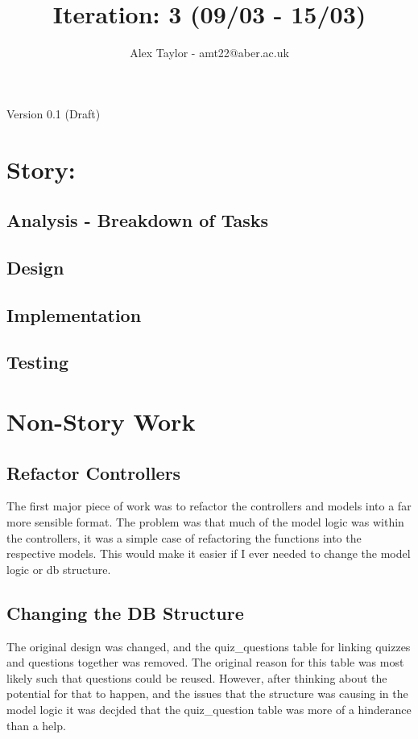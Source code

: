\documentclass{article}
\title{Iteration: 3 (09/03 - 15/03)}
\author{Alex Taylor - amt22@aber.ac.uk}
\begin{document}
\maketitle
\begin{center}
	Version 0.1 (Draft)
\end{center}
\tableofcontents
\thispagestyle{empty}
\newpage

\section{Story: }
\subsection{Analysis - Breakdown of Tasks}
\subsection{Design}
\subsection{Implementation}
\subsection{Testing}
\newpage

\section{Non-Story Work}
\subsection{Refactor Controllers}
The first major piece of work was to refactor the controllers and models into a far more sensible format. The problem was that much of the model logic was within the controllers, it was a simple case of refactoring the functions into the respective models. This would make it easier if I ever needed to change the model logic or db structure.
\subsection{Changing the DB Structure}
The original design was changed, and the quiz\_questions table for linking quizzes and questions together was removed. The original reason for this table was most likely such that questions could be reused. However, after thinking about the potential for that to happen, and the issues that the structure was causing in the model logic it was decjded that the quiz\_question table was more of a hinderance than a help.
\end{document}
